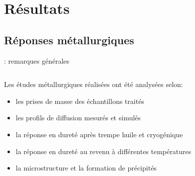\documentclass[aspectratio=169,pdf,t]{beamer}
\begin{document}
\section{Résultats}


\subsection{Réponses métallurgiques}


\begin{frame}{\insertsection}{\insertsubsection: remarques générales}

  \begin{columns}[T]
  	\begin{column}{0.6\textwidth}
      Les études métallurgiques réalisées ont été analysées selon:
      \begin{itemize}
        \item \alert<1->{les prises de masse des échantillons traités}
        \item \alert<2->{les profils de diffusion mesurés et simulés}
        \item \alert<4->{la réponse en dureté après trempe huile et cryogénique}
        \item \alert<6->{la réponse en dureté au revenu à différentes températures}
        \item \alert<8->{la microstructure et la formation de précipités}
      \end{itemize}
      \vspace{0.8cm}
            

\end{column}
\end{columns}
\end{frame}
\end{document}
